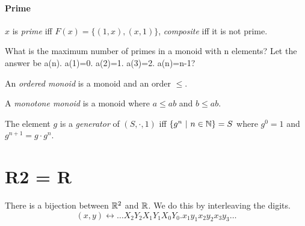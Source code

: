 \paragraph{Prime}
\(x\) is
\emph{prime} iff \(F(x) = \{(1,x),(x,1)\}\),
\emph{composite} iff it is not prime.

What is the maximum number of primes in a monoid with n elements?
Let the answer be a(n).
a(1)=0. a(2)=1. a(3)=2. a(n)=n-1?

An \emph{ordered monoid} is a monoid and an order \(\le\).

A \emph{monotone monoid} is a monoid where \(a \le ab\) and \(b \le ab\).

The element \(g\) is a
%
\emph{generator} of \((S,\cdot,1)\) iff \(\{g^n ~|~ n \in \mathbb{N}\} = S\)
where \(g^0 = 1\) and \(g^{n+1} = g \cdot g^n\).

\section{R2 = R}

There is a bijection between \(\mathbb{R}^2\) and \(\mathbb{R}\).
We do this by interleaving the digits.
\[
    (x, y) \leftrightarrow \ldots X_2 Y_2 X_1 Y_1 X_0 Y_0 . x_1 y_1 x_2 y_2 x_3 y_3 \ldots
\]
